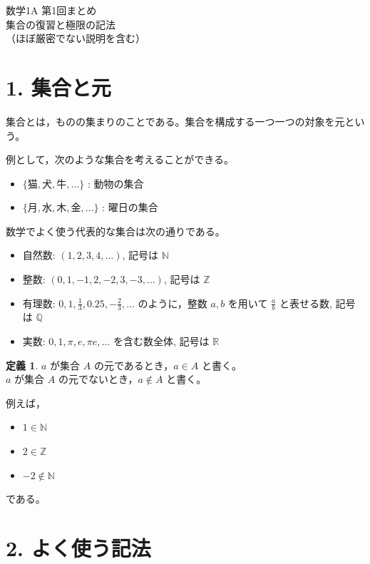 \documentclass[a4paper,12pt]{jsarticle}
\theoremstyle{definition}
\newtheorem*{definition}{定義}
\begin{document}
\begin{center}
{\LARGE 数学1A 第1回まとめ}\\[0.4em]
集合の復習と極限の記法\\
{\small （ほぼ厳密でない説明を含む）}
\end{center}

\section*{1. 集合と元}

集合とは，ものの集まりのことである。集合を構成する一つ一つの対象を元という。

例として，次のような集合を考えることができる。
\begin{itemize}
\item $\{\text{猫},\text{犬},\text{牛},\dots\}$ : 動物の集合
\item $\{\text{月},\text{水},\text{木},\text{金},\dots\}$ : 曜日の集合
\end{itemize}

数学でよく使う代表的な集合は次の通りである。
\begin{itemize}
\item 自然数: $(1,2,3,4,\dots)$, 記号は $\mathbb{N}$
\item 整数: $(0,1,-1,2,-2,3,-3,\dots)$, 記号は $\mathbb{Z}$
\item 有理数: $0,1,\frac{1}{3},0.25,-\frac{2}{3},\dots$ のように，整数 $a,b$ を用いて $\frac{a}{b}$ と表せる数, 記号は $\mathbb{Q}$
\item 実数: $0,1,\pi,e,\pi e,\dots$ を含む数全体, 記号は $\mathbb{R}$
\end{itemize}

\begin{definition}
$a$ が集合 $A$ の元であるとき，$a \in A$ と書く。\\
$a$ が集合 $A$ の元でないとき，$a \notin A$ と書く。
\end{definition}

例えば，
\begin{itemize}
\item $1 \in \mathbb{N}$
\item $2 \in \mathbb{Z}$
\item $-2 \notin \mathbb{N}$
\end{itemize}
である。

\section*{2. よく使う記法}
\end{document}
